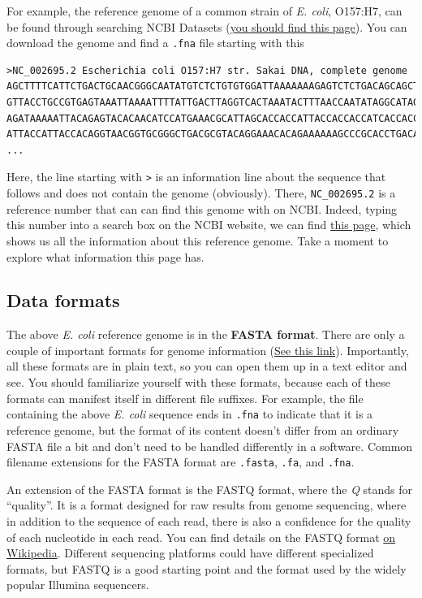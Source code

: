 \documentclass[12pt,letterpaper]{article}
\begin{document}
For example, the reference genome of a common strain of \textit{E. coli}, O157:H7, can be found through searching NCBI Datasets (\href{https://www.ncbi.nlm.nih.gov/datasets/taxonomy/83334/}{you should find this page}). You can download the genome and find a \texttt{.fna} file starting with this

\begin{verbatim}
>NC_002695.2 Escherichia coli O157:H7 str. Sakai DNA, complete genome
AGCTTTTCATTCTGACTGCAACGGGCAATATGTCTCTGTGTGGATTAAAAAAAGAGTCTCTGACAGCAGCTTCTGAACTG
GTTACCTGCCGTGAGTAAATTAAAATTTTATTGACTTAGGTCACTAAATACTTTAACCAATATAGGCATAGCGCACAGAC
AGATAAAAATTACAGAGTACACAACATCCATGAAACGCATTAGCACCACCATTACCACCACCATCACCACCACCATCACC
ATTACCATTACCACAGGTAACGGTGCGGGCTGACGCGTACAGGAAACACAGAAAAAAGCCCGCACCTGACAGTGCGGGCT
...
\end{verbatim}

Here, the line starting with \texttt{>} is an information line about the sequence that follows and does not contain the genome (obviously). There, \texttt{NC\_002695.2} is a reference number that can can find this genome with on NCBI. Indeed, typing this number into a search box on the NCBI website, we can find \href{https://www.ncbi.nlm.nih.gov/nuccore/NC_002695.2/}{this page}, which shows us all the information about this reference genome. Take a moment to explore what information this page has.

\subsection{Data formats}

The above \textit{E. coli} reference genome is in the \textbf{FASTA format}. There are only a couple of important formats for genome information (\href{https://www.animalgenome.org/bioinfo/resources/manuals/seqformats}{See this link}). Importantly, all these formats are in plain text, so you can open them up in a text editor and see. You should familiarize yourself with these formats, because each of these formats can manifest itself in different file suffixes. For example, the file containing the above \textit{E. coli} sequence ends in \texttt{.fna} to indicate that it is a reference genome, but the format of its content doesn't differ from an ordinary FASTA file a bit and don't need to be handled differently in a software. Common filename extensions for the FASTA format are \texttt{.fasta}, \texttt{.fa}, and \texttt{.fna}.

An extension of the FASTA format is the FASTQ format, where the \textit{Q} stands for ``quality''. It is a format designed for raw results from genome sequencing, where in addition to the sequence of each read, there is also a confidence for the quality of each nucleotide in each read. You can find details on the FASTQ format \href{https://en.wikipedia.org/wiki/FASTQ_format}{on Wikipedia}. Different sequencing platforms could have different specialized formats, but FASTQ is a good starting point and the format used by the widely popular Illumina sequencers.
\end{document}
